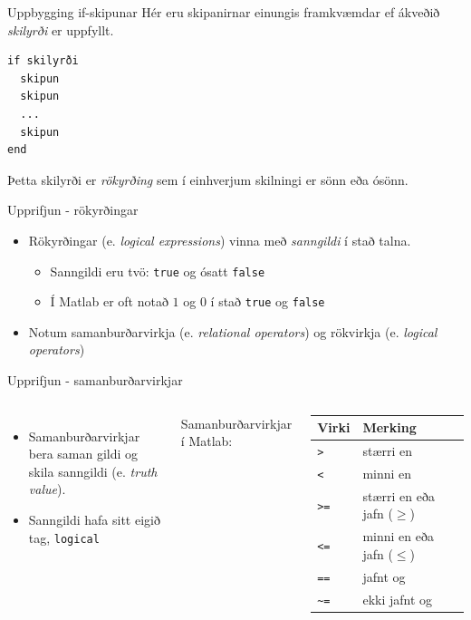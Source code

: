 \documentclass{beamer}
\begin{document}
\begin{frame}[fragile]{Uppbygging if-skipunar}
\vspace{\baselineskip}
Hér eru skipanirnar einungis framkvæmdar ef ákveðið \emph{skilyrði} er uppfyllt.

\begin{verbatim}
if skilyrði
  skipun
  skipun
  ...
  skipun
end
\end{verbatim} 
Þetta skilyrði er \emph{rökyrðing} sem í einhverjum skilningi er sönn eða ósönn.

\end{frame}

\begin{frame}{Upprifjun - rökyrðingar}
\begin{itemize}
 \item Rökyrðingar (e. \emph{logical expressions}) vinna með \emph{sanngildi} í stað talna.
 \begin{itemize}
  \item Sanngildi eru tvö: \texttt{true} og ósatt \texttt{false}
  \item Í Matlab er oft notað $1$ og $0$ í stað \texttt{true} og \texttt{false}
 \end{itemize}
 \item Notum samanburðarvirkja (e. \emph{relational operators}) og rökvirkja (e. \emph{logical operators})
\end{itemize}
\end{frame}

\begin{frame}{Upprifjun - samanburðarvirkjar}
\begin{columns}
\begin{itemize}
 \item Samanburðarvirkjar bera saman gildi og skila sanngildi (e. \emph{truth value}).
 \item Sanngildi hafa sitt eigið tag, \texttt{logical}
\end{itemize}

\vspace{0.5cm}
Samanburðarvirkjar í Matlab: 

\vspace{0.2cm}
\begin{tabular}{ll}
\toprule
Virki&Merking\\
\midrule
\texttt{>}&stærri en\\
\texttt{<}&minni en\\
\texttt{>=}&stærri en eða jafn ($\geq$)\\
\texttt{<=}&minni en eða jafn ($\leq$)\\
\texttt{==}&jafnt og\\
\texttt{\~}\texttt{=}&ekki jafnt og\\
\bottomrule
\end{tabular}
\end{columns}
\end{frame}
\end{document}
